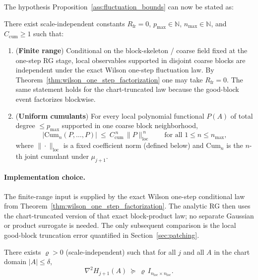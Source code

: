 The hypothesis Proposition~\ref{ass:fluctuation_bounds} can now be stated as:

\begin{proposition}\label{ass:FR_Cum}
There exist scale-independent constants $R_{\mathrm{fr}}=0$, $p_{\max}\in\mathbb N$, $n_{\max}\in\mathbb N$, and $C_{\mathrm{cum}}\ge 1$ such that:
\begin{enumerate}[label=(FC\arabic*)]
\item (\textbf{Finite range}) Conditional on the block-skeleton / coarse field fixed at the one-step RG stage, local observables supported in disjoint coarse blocks are independent under the exact Wilson one-step fluctuation law. By Theorem~\ref{thm:wilson_one_step_factorization} one may take $R_{\mathrm{fr}}=0$. The same statement holds for the chart-truncated law because the good-block event factorizes blockwise.
\item (\textbf{Uniform cumulants}) For every local polynomial functional $P(A)$ of total degree $\le p_{\max}$ supported in one coarse block neighborhood,
\[
\big|\mathrm{Cum}_n(P,\dots,P)\big|\ \le\ C_{\mathrm{cum}}^{\,n}\,\|P\|_{\mathrm{loc}}^{\,n}
\qquad\text{for all } 1\le n\le n_{\max},
\]
where $\|\cdot\|_{\mathrm{loc}}$ is a fixed coefficient norm (defined below) and $\mathrm{Cum}_n$ is the $n$-th joint cumulant under $\mu_{j+1}$.
\end{enumerate}
\end{proposition}

\paragraph{Implementation choice.}
The finite-range input is supplied by the exact Wilson one-step conditional law from Theorem~\ref{thm:wilson_one_step_factorization}. The analytic RG then uses the chart-truncated version of that exact block-product law; no separate Gaussian or product surrogate is needed. The only subsequent comparison is the local good-block truncation error quantified in Section~\ref{sec:patching}.

\begin{proposition}\label{ass:uniform_convexity}
There exists $\varrho>0$ (scale-independent) such that for all $j$ and all $A$ in the chart domain $|A|\le \delta$,
\begin{equation}\label{eq:hess_lb}
\nabla^2 H_{j+1}(A)\ \succeq\ \varrho\,I_{n_{\mathrm{loc}}\times n_{\mathrm{loc}}}.
\end{equation}
\end{proposition}

